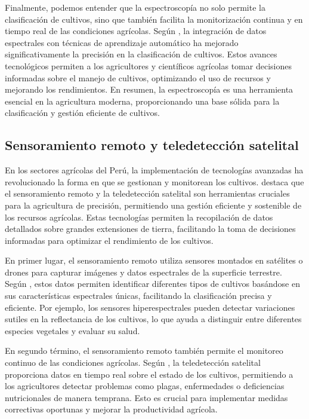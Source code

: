 Finalmente, podemos entender que la espectroscopía no solo permite la clasificación de cultivos, sino que también facilita la monitorización continua y en tiempo real de las condiciones agrícolas. Según \cite{En2009}, la integración de datos espectrales con técnicas de aprendizaje automático ha mejorado significativamente la precisión en la clasificación de cultivos. Estos avances tecnológicos permiten a los agricultores y científicos agrícolas tomar decisiones informadas sobre el manejo de cultivos, optimizando el uso de recursos y mejorando los rendimientos. En resumen, la espectroscopía es una herramienta esencial en la agricultura moderna, proporcionando una base sólida para la clasificación y gestión eficiente de cultivos.

\subsection{Sensoramiento remoto y teledetección satelital}
En los sectores agrícolas del Perú, la implementación de tecnologías avanzadas ha revolucionado la forma en que se gestionan y monitorean los cultivos. \cite{En2009} destaca que el sensoramiento remoto y la teledetección satelital son herramientas cruciales para la agricultura de precisión, permitiendo una gestión eficiente y sostenible de los recursos agrícolas. Estas tecnologías permiten la recopilación de datos detallados sobre grandes extensiones de tierra, facilitando la toma de decisiones informadas para optimizar el rendimiento de los cultivos.

En primer lugar, el sensoramiento remoto utiliza sensores montados en satélites o drones para capturar imágenes y datos espectrales de la superficie terrestre. Según \cite{Vullaganti2025}, estos datos permiten identificar diferentes tipos de cultivos basándose en sus características espectrales únicas, facilitando la clasificación precisa y eficiente. Por ejemplo, los sensores hiperespectrales pueden detectar variaciones sutiles en la reflectancia de los cultivos, lo que ayuda a distinguir entre diferentes especies vegetales y evaluar su salud.

En segundo término, el sensoramiento remoto también permite el monitoreo continuo de las condiciones agrícolas. Según \cite{Brown2025}, la teledetección satelital proporciona datos en tiempo real sobre el estado de los cultivos, permitiendo a los agricultores detectar problemas como plagas, enfermedades o deficiencias nutricionales de manera temprana. Esto es crucial para implementar medidas correctivas oportunas y mejorar la productividad agrícola.

